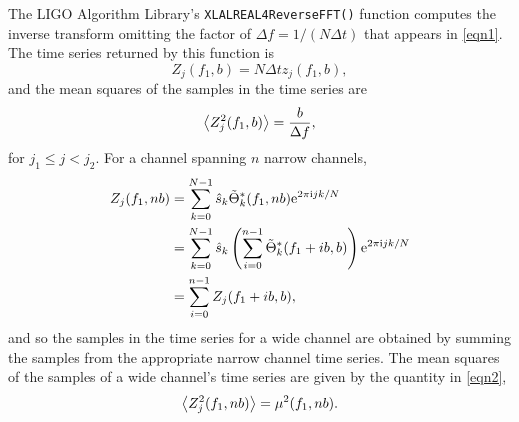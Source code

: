 \documentclass{article}
\begin{document}
The LIGO Algorithm Library's \texttt{XLALREAL4ReverseFFT()} function
computes the inverse transform omitting the factor of \(\Delta f = 1 / (N
\Delta t)\) that appears in \eqref{eqn1}.  The time series returned by this
function is
\begin{equation}
Z_{j}(f_{1}, b)
   = N \Delta t z_{j}(f_{1}, b),
\end{equation}
and the mean squares of the samples in the time series are
\begin{equation}
\left\langle Z_{j}^{2}(f_{1}, b)\right\rangle
   = \frac{b}{\Delta f},
\end{equation}
for \(j_{1} \leq j < j_{2}\).  For a channel spanning \(n\) narrow
channels,
\begin{align}
Z_{j}(f_{1}, n b)
   & = \sum_{k = 0}^{N - 1} \hat{s}_{k} \tilde{\Theta}^{*}_{k}(f_{1}, n
   b) \mathrm{e}^{2 \pi \mathrm{i} j k / N}
   \\
   & = \sum_{k = 0}^{N - 1} \hat{s}_{k} \left( \sum_{i = 0}^{n - 1}
   \tilde{\Theta}^{*}_{k}(f_{1} + i b, b) \right) \mathrm{e}^{2 \pi \mathrm{i} j k /
   N}
   \\
   & = \sum_{i = 0}^{n - 1} Z_{j}(f_{1} + i b, b),
\end{align}
and so the samples in the time series for a wide channel are obtained by
summing the samples from the appropriate narrow channel time series.  The
mean squares of the samples of a wide channel's time series are given by
the quantity in \eqref{eqn2},
\begin{equation}
\left\langle Z_{j}^{2}(f_{1}, n b)\right\rangle
   = \mu^{2}(f_{1}, n b).
\end{equation}
\end{document}
